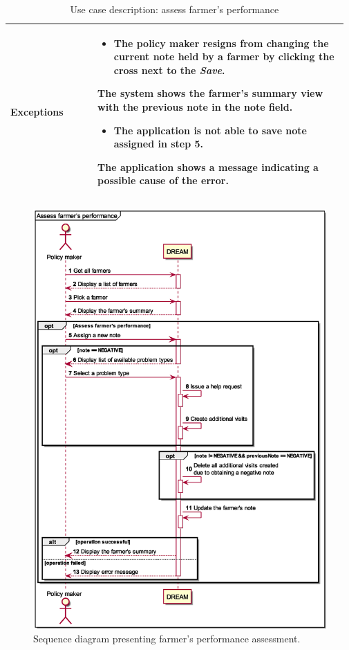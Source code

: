 \begin{table}[H]
\begin{tabular}{@{}p{0.25\linewidth} p{0.72\linewidth}@{}}
		\textbf{Exceptions}         & \begin{itemize}[leftmargin=.4cm,noitemsep,topsep=0pt,before=\vspace{-3mm}]
		   \item The policy maker resigns from changing the current note held by a farmer by clicking the cross next to the \textit{Save}. 
		\end{itemize}
	    The system shows the farmer's summary view with the previous note in the note field.
	    \begin{itemize}[leftmargin=.4cm,noitemsep,topsep=0pt]
		   \item The application is not able to save note assigned in step 5.
		\end{itemize}
		The application shows a message indicating a possible cause of the error.
		\\\bottomrule
	\end{tabular}
	\caption{Use case description: assess farmer's performance} 
\end{table}

\begin{figure}[H]
    \centering
    \includegraphics[scale=0.6, keepaspectratio, origin=c]{diagrams/sequence/assess_farmers_performance}
    \caption{Sequence diagram presenting farmer's performance assessment.}
    \label{fig:sd_assess_farmers_performance}
\end{figure}

